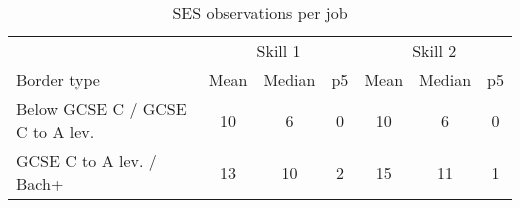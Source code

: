 \begin{table}
	\caption{SES observations per job}
	\label{tab:sesBorderJobs}
	\centering
	\begin{tabular}{lcccccc}
	
& \multicolumn{3}{c}{Skill 1}& \multicolumn{3}{c}{Skill 2}\\
Border type & Mean & Median& p5 & Mean & Median & p5 \\
\midrule
Below GCSE C / GCSE C to A lev.&10&6&0&10&6&0 \\
GCSE C to A lev. / Bach+&13&10&2&15&11&1 \\
\bottomrule
\end{tabular}
\end{table}
